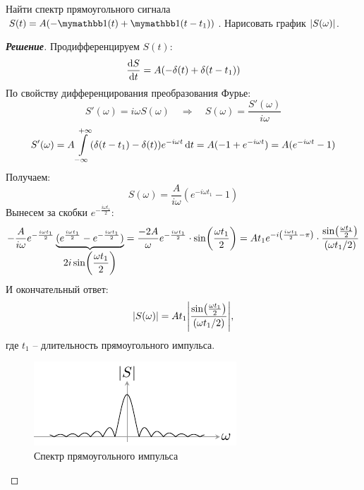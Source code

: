\begin{task}
	Найти спектр прямоугольного сигнала $S(t)=A\qty(-\H(t)+\H(t-t_1))$.
	Нарисовать график $\abs{S(\omega)}$.
\end{task}

\begin{proof}[\rm{\textbf{Решение}}]
	Продифференцируем $S(t)$:
	\begin{equation}
		\dv{S}{t}=A(-\delta(t)+\delta(t-t_1))
	\end{equation}
	По свойству дифференцирования преобразования Фурье:
	\begin{equation}
		S'(\omega)=i \omega S(\omega) 
			\quad\Longrightarrow\quad
			S(\omega)=\frac{S'(\omega)}{i \omega}
	\end{equation}
	\begin{gather*}
		S'(\omega)=A\int\limits_{-\infty}^{+\infty} (\delta(t-t_1)-\delta(t))e^{-i \omega t} \dd{t}
			=A(-1 +e^{-i \omega t}) = A(e^{-i \omega t} -1)
	\end{gather*}
	Получаем:
	\begin{equation}
		S(\omega)=\frac{A}{i \omega} (e^{-i \omega t_1}-1)
	\end{equation}
	Вынесем за скобки $e^{-\frac{i \omega t_1}{2}}$:
	\begin{equation}
		-\frac{A}{i \omega} e^{-\frac{i \omega t_1}{2}}
		\underbrace{
			(e^{\frac{i \omega t_1}{2}} 
			-e^{-\frac{i \omega t_1}{2}})}
			_{\displaystyle 2i\sin(\frac{\omega t_1}{2})}=
		\frac{-2A}{\omega}
			e^{-\frac{i \omega t_1}{2}}
			\cdot\sin(\frac{\omega t_1}{2})=\\
		At_1e^{-i\qty(\frac{i \omega t_1}{2}-\pi)}\cdot 
		\frac{\sin(\frac{\omega t_1}{2})}{\qty(\omega t_1/2)}
	\end{equation}
	И окончательный ответ:
	\begin{equation}
		\abs{S(\omega)}=At_1
			\abs{
				\frac{\sin(\frac{\omega t_1}{2})}{\qty(\omega t_1/2)}
			},
	\end{equation}
	где $t_1$ -- длительность прямоугольного импульса.
	\begin{figure}[h!]
		\centering
		\includegraphics[scale=1.8]{ris/task5_out}		
		\caption{Спектр прямоугольного импульса}
	\end{figure}

\end{proof} 